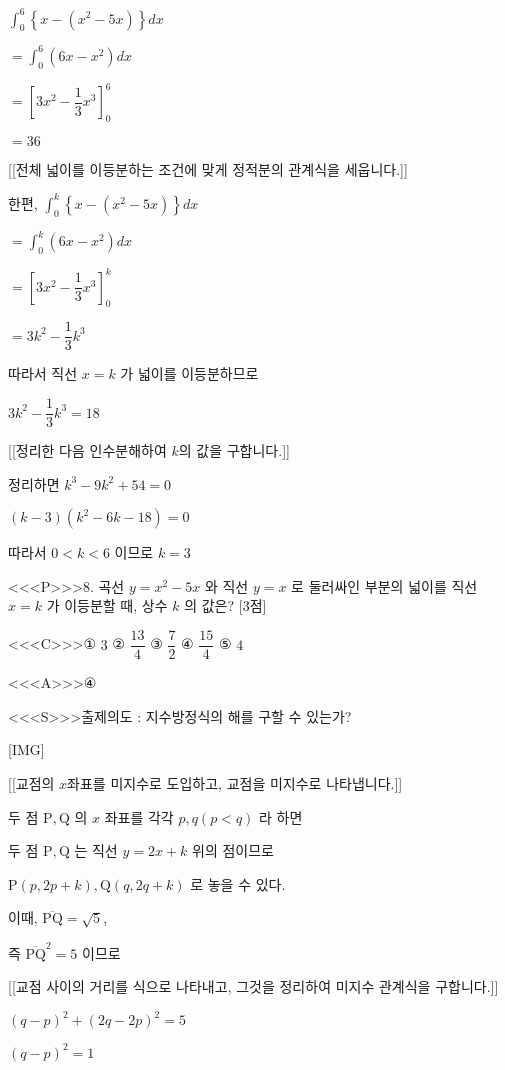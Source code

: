 \documentclass{oblivoir}
\begin{document}
$\displaystyle\int_{0}^{6}\left\{x-\left(x^{2}-5 x\right)\right\} d x$

$=\displaystyle\int_{0}^{6}\left(6 x-x^{2}\right) d x$

$=\left[3 x^{2}-\dfrac{1}{3} x^{3}\right]_{0}^{6}$

$=36$

[[전체 넓이를 이등분하는 조건에 맞게 정적분의 관계식을 세웁니다.]]

한편, $\displaystyle\int_{0}^{k}\left\{x-\left(x^{2}-5 x\right)\right\} d x$

$=\displaystyle\int_{0}^{k}\left(6 x-x^{2}\right) d x$

$=\left[3 x^{2}-\dfrac{1}{3} x^{3}\right]_{0}^{k}$

$=3 k^{2}-\dfrac{1}{3} k^{3}$

따라서 직선 $x=k$ 가 넓이를 이등분하므로

$3 k^{2}-\dfrac{1}{3} k^{3} =18$

[[정리한 다음 인수분해하여 $k$의 값을 구합니다.]]

정리하면 $k^{3}-9 k^{2}+54=0$

$(k-3)\left(k^{2}-6 k-18\right)=0$

따라서 $0< k< 6$ 이므로 $k=3$

<<<P>>>8. 곡선 $y=x^{2}-5 x$ 와 직선 $y=x$ 로 둘러싸인 부분의 넓이를 직선 $x=k$ 가 이등분할 때, 상수 $k$ 의 값은? [3점]

<<<C>>>① $3$
② $\dfrac{13}{4}$
③ $\dfrac{7}{2}$
④ $\dfrac{15}{4}$
⑤ $4$

<<<A>>>④

<<<S>>>출제의도 : 지수방정식의 해를 구할 수 있는가?

[IMG]

[[교점의 $x$좌표를 미지수로 도입하고, 교점을 미지수로 나타냅니다.]]

두 점 $\mathrm{P}, \mathrm{Q}$ 의 $x$ 좌표를 각각 $p, q(p<  q)$ 라 하면

두 점 $\mathrm{P}, \mathrm{Q}$ 는 직선 $y=2 x+k$ 위의 점이므로

$\mathrm{P}(p, 2 p+k), \mathrm{Q}(q, 2 q+k)$ 로 놓을 수 있다.

이때, $\overline{\mathrm{PQ}}=\sqrt{5}$,

즉 $\overline{\mathrm{PQ}}^{2}=5$ 이므로

[[교점 사이의 거리를 식으로 나타내고, 그것을 정리하여 미지수 관계식을 구합니다.]]

$(q-p)^{2}+(2 q-2 p)^{2}=5$

$(q-p)^{2}=1$
\end{document}
